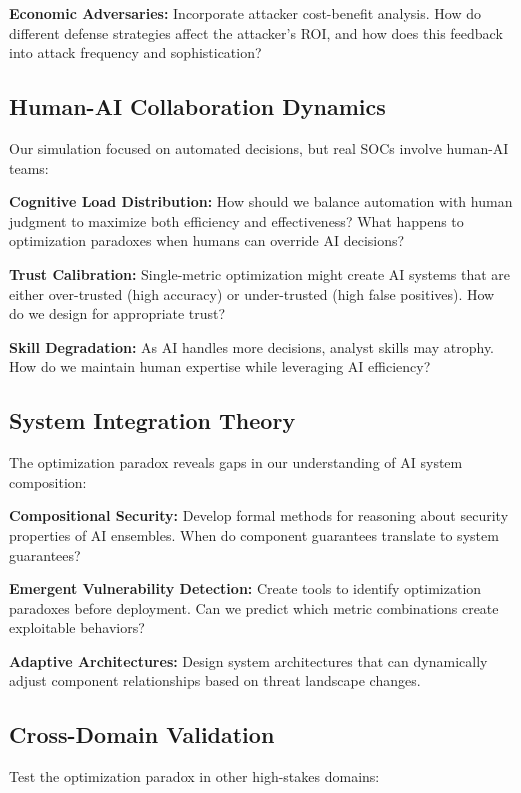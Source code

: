 \documentclass[10pt,conference]{IEEEtran}
\begin{document}
\textbf{Economic Adversaries:} Incorporate attacker cost-benefit analysis. How do different defense strategies affect the attacker's ROI, and how does this feedback into attack frequency and sophistication?

\subsection{Human-AI Collaboration Dynamics}

Our simulation focused on automated decisions, but real SOCs involve human-AI teams:

\textbf{Cognitive Load Distribution:} How should we balance automation with human judgment to maximize both efficiency and effectiveness? What happens to optimization paradoxes when humans can override AI decisions?

\textbf{Trust Calibration:} Single-metric optimization might create AI systems that are either over-trusted (high accuracy) or under-trusted (high false positives). How do we design for appropriate trust?

\textbf{Skill Degradation:} As AI handles more decisions, analyst skills may atrophy. How do we maintain human expertise while leveraging AI efficiency?

\subsection{System Integration Theory}

The optimization paradox reveals gaps in our understanding of AI system composition:

\textbf{Compositional Security:} Develop formal methods for reasoning about security properties of AI ensembles. When do component guarantees translate to system guarantees?

\textbf{Emergent Vulnerability Detection:} Create tools to identify optimization paradoxes before deployment. Can we predict which metric combinations create exploitable behaviors?

\textbf{Adaptive Architectures:} Design system architectures that can dynamically adjust component relationships based on threat landscape changes.

\subsection{Cross-Domain Validation}

Test the optimization paradox in other high-stakes domains:
\end{document}
